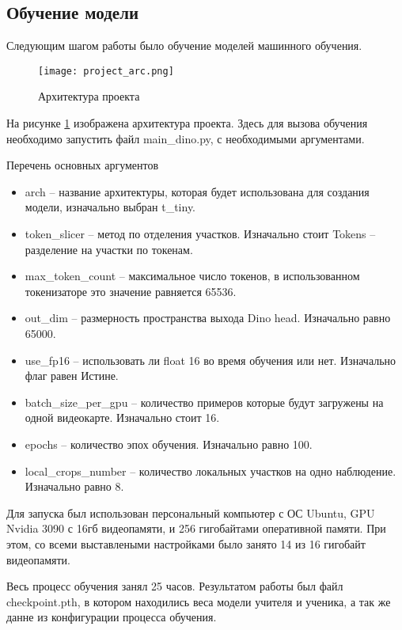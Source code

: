 \documentclass[../part_3.tex]{subfiles}
\begin{document}
\subsection{Обучение модели}
\par Следующим шагом работы было обучение моделей машинного обучения. 
\begin{figure}[H]
    \centering
    \texttt{[image: project\_arc.png]}
    \caption{Архитектура проекта}
    \label{fig:project_arc}
\end{figure}
\par На рисунке \ref{fig:project_arc} изображена архитектура проекта. Здесь для вызова обучения необходимо запустить файл main\_dino.py, с необходимыми аргументами.
\par Перечень основных аргументов
\begin{itemize}
    \item arch -- название архитектуры, которая будет использована для создания модели, изначально выбран t\_tiny.
    \item token\_slicer -- метод по отделения участков. Изначально стоит Tokens -- разделение на участки по токенам.
    \item max\_token\_count -- максимальное число токенов, в использованном токенизаторе это значение равняется 65536.
    \item out\_dim -- размерность пространства выхода Dino head. Изначально равно 65000.
    \item use\_fp16 -- использовать ли float 16 во время обучения или нет. Изначально флаг равен Истине.
    \item batch\_size\_per\_gpu -- количество примеров которые будут загружены на одной видеокарте. Изначально стоит 16.
    \item epochs -- количество эпох обучения. Изначально равно 100.
    \item local\_crops\_number -- количество локальных участков на одно наблюдение. Изначально равно 8.
\end{itemize}
\par Для запуска был использован персональный компьютер с ОС Ubuntu, GPU Nvidia 3090 с 16гб видеопамяти, и 256 гигобайтами оперативной памяти. При этом, со всеми выставлеными настройками было занято 14 из 16 гигобайт видеопамяти.
\par Весь процесс обучения занял 25 часов. Результатом работы был файл checkpoint.pth, в котором находились веса модели учителя и ученика, а так же данне из конфигурации процесса обучения.
\end{document}
